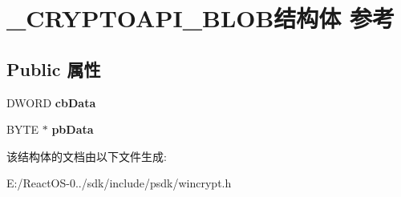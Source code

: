 \hypertarget{struct___c_r_y_p_t_o_a_p_i___b_l_o_b}{}\section{\+\_\+\+C\+R\+Y\+P\+T\+O\+A\+P\+I\+\_\+\+B\+L\+O\+B结构体 参考}
\label{struct___c_r_y_p_t_o_a_p_i___b_l_o_b}
\subsection*{Public 属性}
\begin{DoxyCompactItemize}
\item 
\mbox{\label{struct___c_r_y_p_t_o_a_p_i___b_l_o_b_a19c4e1ff96424b96001cc3bbfee5892a}} 
D\+W\+O\+RD {\bfseries cb\+Data}
\item 
\mbox{\label{struct___c_r_y_p_t_o_a_p_i___b_l_o_b_a55b37075a5532ab8a9d9ccfc35813320}} 
B\+Y\+TE $\ast$ {\bfseries pb\+Data}
\end{DoxyCompactItemize}


该结构体的文档由以下文件生成\+:\begin{DoxyCompactItemize}
\item 
E\+:/\+React\+O\+S-\/0../sdk/include/psdk/wincrypt.\+h\end{DoxyCompactItemize}
